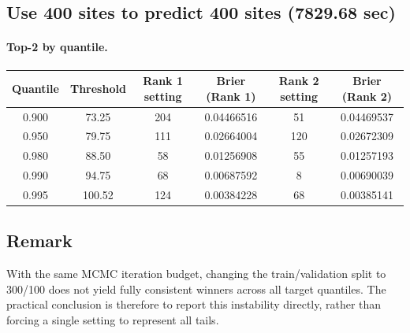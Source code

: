 \documentclass[11pt]{article}
\begin{document}
\subsection{Use 400 sites to predict 400 sites (7829.68 sec)}

\paragraph{Top-2 by quantile.}
\begin{center}
\small
\begin{tabular}{@{}cccccc@{}}
\toprule
Quantile & Threshold & Rank 1 setting & Brier (Rank 1) & Rank 2 setting & Brier (Rank 2) \\
\midrule
0.900 & 73.25 & 204 & 0.04466516 & 51 & 0.04469537 \\
0.950 & 79.75 & 111 & 0.02664004 & 120 & 0.02672309 \\
0.980 & 88.50 & 58 & 0.01256908 & 55 & 0.01257193 \\
0.990 & 94.75 & 68 & 0.00687592 & 8 & 0.00690039 \\
0.995 & 100.52 & 124 & 0.00384228 & 68 & 0.00385141 \\
\bottomrule
\end{tabular}
\end{center}

\subsection{Remark}

With the same MCMC iteration budget, changing the train/validation split to
300/100 does not yield fully consistent winners across all target quantiles.
The practical conclusion is therefore to report this instability directly,
rather than forcing a single setting to represent all tails.
\end{document}
